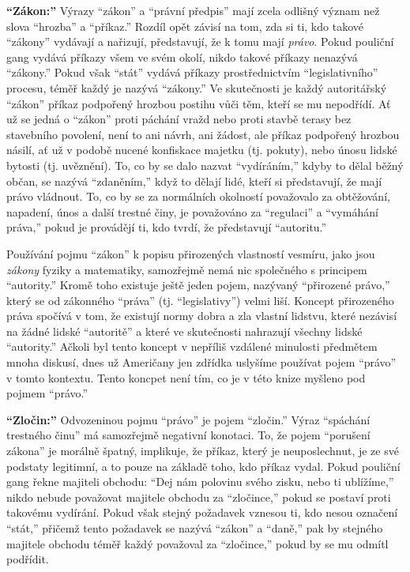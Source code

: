 \documentclass{book}
\begin{document}
\textbf{\enquote{Zákon:}} Výrazy \enquote{zákon} a \enquote{právní předpis} mají zcela odlišný význam než slova \enquote{hrozba} a \enquote{příkaz.} Rozdíl opět závisí na tom, zda si ti, kdo takové \enquote{zákony} vydávají a nařizují, představují, že k tomu mají \emph{právo}. Pokud pouliční gang vydává příkazy všem ve svém okolí, nikdo takové příkazy nenazývá \enquote{zákony.} Pokud však \enquote{stát} vydává příkazy prostřednictvím \enquote{legislativního} procesu, téměř každý je nazývá \enquote{zákony.} Ve skutečnosti je každý autoritářský \enquote{zákon} příkaz podpořený hrozbou postihu vůči těm, kteří se mu nepodřídí. Ať už se jedná o \enquote{zákon} proti páchání vražd nebo proti stavbě terasy bez stavebního povolení, není to ani návrh, ani žádost, ale příkaz podpořený hrozbou násilí, ať už v podobě nucené konfiskace majetku (tj. pokuty), nebo únosu lidské bytosti (tj. uvěznění). To, co by se dalo nazvat \enquote{vydíráním,} kdyby to dělal běžný občan, se nazývá \enquote{zdaněním,} když to dělají lidé, kteří si představují, že mají právo vládnout. To, co by se za normálních okolností považovalo za obtěžování, napadení, únos a další trestné činy, je považováno za \enquote{regulaci} a \enquote{vymáhání práva,} pokud je provádějí ti, kdo tvrdí, že představují \enquote{autoritu.}

Používání pojmu \enquote{zákon} k popisu přirozených vlastností vesmíru, jako jsou \emph{zákony} fyziky a matematiky, samozřejmě nemá nic společného s principem \enquote{autority.} Kromě toho existuje ještě jeden pojem, nazývaný \enquote{přirozené právo,} který se od zákonného \enquote{práva} (tj. \enquote{legislativy}) velmi liší. Koncept přirozeného práva spočívá v tom, že existují normy dobra a zla vlastní lidstvu, které nezávisí na žádné lidské \enquote{autoritě} a které ve skutečnosti nahrazují všechny lidské \enquote{autority.} Ačkoli byl tento koncept v nepříliš vzdálené minulosti předmětem mnoha diskusí, dnes už Američany jen zdřídka uslyšíme používat pojem \enquote{právo} v tomto kontextu. Tento koncpet není tím, co je v této knize myšleno pod pojmem \enquote{právo.}

\textbf{\enquote{Zločin:}} Odvozeninou pojmu \enquote{právo} je pojem \enquote{zločin.} Výraz \enquote{spáchání trestného činu} má samozřejmě negativní konotaci. To, že pojem \enquote{porušení zákona} je morálně špatný, implikuje, že příkaz, který je neuposlechnut, je ze své podstaty legitimní, a to pouze na základě toho, kdo příkaz vydal. Pokud pouliční gang řekne majiteli obchodu: \enquote{Dej nám polovinu svého zisku, nebo ti ublížíme,} nikdo nebude považovat majitele obchodu za \enquote{zločince,} pokud se postaví proti takovému vydírání. Pokud však stejný požadavek vznesou ti, kdo nesou označení \enquote{stát,} přičemž tento požadavek se nazývá \enquote{zákon} a \enquote{daně,} pak by stejného majitele obchodu téměř každý považoval za \enquote{zločince,} pokud by se mu odmítl podřídit.
\end{document}
